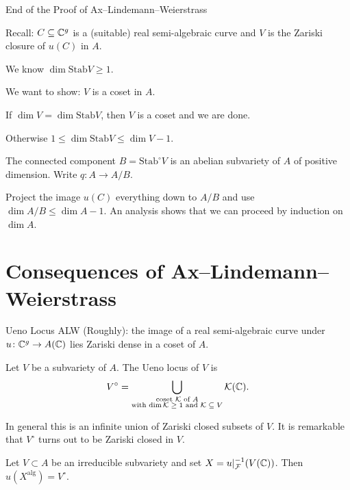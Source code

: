 \documentclass{beamer}
\begin{document}
\begin{frame}{End of the Proof of
    Ax--Lindemann--Weierstrass}

  Recall: $C\subseteq {\mathbb{C}}^g$ is a (suitable) real semi-algebraic curve and $V$ is the
  Zariski closure of $u(C)$ in $A$.

  We know $\dim\mathrm{Stab} V\ge 1$.

  We want to show: $V$ is a coset in $A$. 

  If $\dim V = \dim \mathrm{Stab} V$, then $V$ is a coset and we are
  done.

  Otherwise $1\le \dim \mathrm{Stab} V \le \dim V-1$.
  
  The connected component $B = \mathrm{Stab}^\circ V$ is an abelian
  subvariety of $A$ of positive dimension. Write $q\colon A\rightarrow
  A/B$.

  Project the image $u(C)$ everything down
  to $A/B$ and use $\dim A/B \le \dim A-1$.  An analysis shows that we
  can proceed by induction on $\dim A$. 
\end{frame}

\section{Consequences of Ax--Lindemann--Weierstrass}

\begin{frame}{Ueno Locus}
  ALW (Roughly): the image of a real semi-algebraic curve under
  $u\colon {\mathbb{C}}^g\rightarrow A({\mathbb{C}})$ lies Zariski dense in a coset of
  $A$.
  
  \begin{definition}
    Let $V$ be a subvariety of $A$. The \alert{Ueno locus} of $V$ is 
    \begin{equation*}
      V^{\circ} = \bigcup_{\substack{\text{coset ${\mathcal K}$ of $A$} \\\text{with $\dim
            {\mathcal K}\ge 1$ and ${\mathcal K}\subseteq
            V$}}} {\mathcal K}({\mathbb{C}}).
    \end{equation*}
  \end{definition}

  In general this is an \alert{infinite} union of Zariski closed
  subsets of $V$. It is 
  remarkable that $V^{\circ}$  turns out to be Zariski closed in $V$.

  \begin{theorem}
    Let $V\subset A$ be an irreducible subvariety and set
    $X = u|_{{\mathcal F}}^{-1}(V({\mathbb{C}}))$.
    Then $u(X^{\mathrm{alg}}) = V^{\circ}$.
  \end{theorem}

\end{frame}
\end{document}
